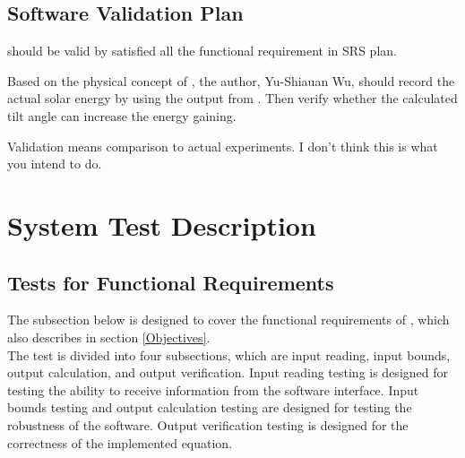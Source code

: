 \documentclass[12pt, titlepage]{article}
\begin{document}
 

\subsection{Software Validation Plan}

\progname{} should be valid by satisfied all the functional requirement in SRS 
plan.

Based on the physical concept of \progname, the author, Yu-Shiauan Wu, should
record the actual solar energy by using the output from \progname. Then verify
whether the calculated tilt angle can increase the energy gaining.

{Validation means comparison to actual experiments.  I don't think this is what
  you intend to do.}


\section{System Test Description}\label{STD}	
\subsection{Tests for Functional Requirements}

The subsection below is designed to cover the functional requirements of
\progname, which also describes in section \ref{Objectives}.\\
The test is divided into four subsections, which are input reading, input
bounds,
output calculation, and output verification. Input reading testing is designed
for
testing the ability to receive information from the software interface. Input
bounds
testing and output calculation testing are designed for testing the robustness
of the
software. Output verification testing is designed for the correctness of the 
implemented equation.

 
\end{document}
